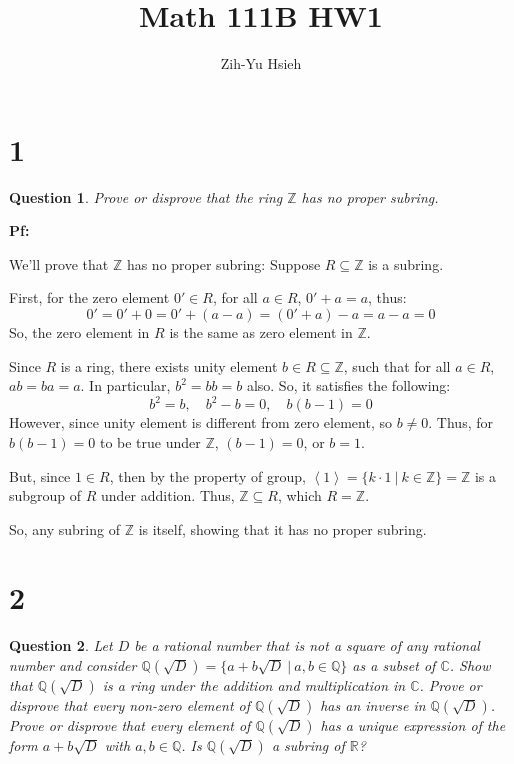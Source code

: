 \documentclass{article}
\title{Math 111B HW1}
\author{Zih-Yu Hsieh}
\newtheorem{question}{Question}
\begin{document}
\maketitle

\section*{1}
\begin{question}
    Prove or disprove that the ring $\mathbb{Z}$ has no proper subring.
\end{question}

\textbf{Pf:}

We'll prove that $\mathbb{Z}$ has no proper subring: Suppose $R\subseteq \mathbb{Z}$ is a subring.

\hfill

First, for the zero element $0'\in R$, for all $a\in R$, $0'+a = a$, thus: 
$$0' = 0'+0 = 0' + (a-a) = (0'+a)-a = a-a = 0$$
So, the zero element in $R$ is the same as zero element in $\mathbb{Z}$.

\hfill

Since $R$ is a ring, there exists unity element $b\in R\subseteq \mathbb{Z}$, such that for all $a\in R$,
$ab=ba=a$. In particular, $b^2=bb=b$ also. So, it satisfies the following:
$$b^2=b,\quad b^2-b=0,\quad b(b-1)=0$$
However, since unity element is different from zero element, so $b\neq 0$. Thus, for $b(b-1)=0$ to be true under $\mathbb{Z}$,
$(b-1)=0$, or $b=1$.

\hfill

But, since $1\in R$, then by the property of group, $\left<1\right> = \{k\cdot 1\ |\ k\in\mathbb{Z}\} = \mathbb{Z}$ is a subgroup of $R$ under addition.
Thus, $\mathbb{Z}\subseteq R$, which $R=\mathbb{Z}$.

So, any subring of $\mathbb{Z}$ is itself, showing that it has no proper subring.

\break

\section*{2}
\begin{question}
    Let $D$ be a rational number that is not a square of any rational number and consider
    $\mathbb{Q}(\sqrt{D})=\{a+b\sqrt{D}\ |\ a,b\in\mathbb{Q}\}$ as a subset of $\mathbb{C}$. 
    Show that $\mathbb{Q}(\sqrt{D})$ is a ring under the addition and multiplication in $\mathbb{C}$. 
    Prove or disprove that every non-zero element of $\mathbb{Q}(\sqrt{D})$ has an inverse in $\mathbb{Q}(\sqrt{D})$. 
    Prove or disprove that every element of $\mathbb{Q}(\sqrt{D})$ has a unique expression of the form 
    $a+b\sqrt{D}$ with $a,b\in\mathbb{Q}$. Is $\mathbb{Q}(\sqrt{D})$ a subring of $\mathbb{R}$?
\end{question}
\end{document}
